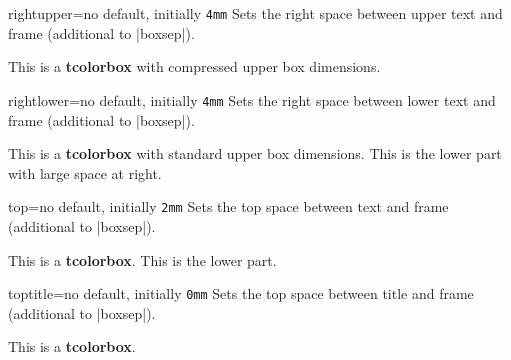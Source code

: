 \begin{docTcbKey}{rightupper}{=}{no default, initially \texttt{4mm}}
  Sets the right space between upper text and frame (additional to |boxsep|).
\begin{dispExample}

\begin{tcolorbox}[width=5cm,rightupper=2cm,title=My very long title text]
This is a \textbf{tcolorbox} with compressed upper box dimensions.
\end{tcolorbox}
\end{dispExample}
\end{docTcbKey}


\clearpage
\begin{docTcbKey}{rightlower}{=}{no default, initially \texttt{4mm}}
  Sets the right space between lower text and frame (additional to |boxsep|).
\begin{dispExample}

\begin{tcolorbox}[width=5cm,rightlower=2cm]
This is a \textbf{tcolorbox} with standard upper box dimensions.
\tcblower
This is the lower part with large space at right.
\end{tcolorbox}
\end{dispExample}
\end{docTcbKey}



\begin{docTcbKey}{top}{=}{no default, initially \texttt{2mm}}
  Sets the top space between text and frame (additional to |boxsep|).
\begin{dispExample}

\begin{tcolorbox}[top=0mm]
This is a \textbf{tcolorbox}.
\tcblower
This is the lower part.
\end{tcolorbox}
\end{dispExample}
\end{docTcbKey}


\begin{docTcbKey}{toptitle}{=}{no default, initially \texttt{0mm}}
  Sets the top space between title and frame (additional to |boxsep|).
\begin{dispExample}

\begin{tcolorbox}[toptitle=3mm,title=My title]
This is a \textbf{tcolorbox}.
\end{tcolorbox}
\end{dispExample}
\end{docTcbKey}

